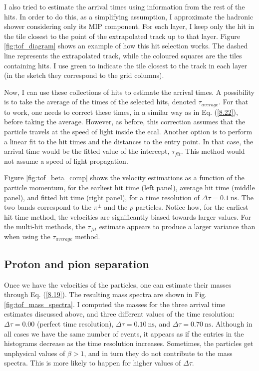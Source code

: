I also tried to estimate the arrival times using information from the rest of the hits. In order to do this, as a simplifying assumption, I approximate the hadronic shower considering only its MIP component. For each layer, I keep only the hit in the tile closest to the point of the extrapolated track up to that layer. Figure \ref{fig:tof_diagram} shows an example of how this hit selection works. The dashed line represents the extrapolated track, while the coloured squares are the tiles containing hits. I use green to indicate the tile closest to the track in each layer (in the sketch they correspond to the grid columns).

Now, I can use these collections of hits to estimate the arrival times. A possibility is to take the average of the times of the selected hits, denoted $\tau_{average}$. For that to work, one needs to correct these times, in a similar way as in Eq. (\ref{8.22}), before taking the average. However, as before, this correction assumes that the particle travels at the speed of light inside the \gls{ecal}. Another option is to perform a linear fit to the hit times and the distances to the entry point. In that case, the arrival time would be the fitted value of the intercept, $\tau_{fit}$. This method would not assume a speed of light propagation.

Figure \ref{fig:tof_beta_comp} shows the velocity estimations as a function of the particle momentum, for the earliest hit time (left panel), average hit time (middle panel), and fitted hit time (right panel), for a time resolution of $\Delta \tau = 0.1 ~ \mathrm{ns}$. The two bands correspond to the $\pi^{\pm}$ and the $p$ particles. Notice how, for the earliest hit time method, the velocities are significantly biased towards larger values. For the multi-hit methods, the $\tau_{fit}$ estimate appears to produce a larger variance than when using the $\tau_{average}$ method.

\subsection{Proton and pion separation}

Once we have the velocities of the particles, one can estimate their masses through Eq. (\ref{8.19}). The resulting mass spectra are shown in Fig. \ref{fig:tof_mass_spectra}. I computed the masses for the three arrival time estimates discussed above, and three different values of the time resolution: $\Delta \tau = 0.00$ (perfect time resolution), $\Delta \tau = 0.10 ~ \mathrm{ns}$, and $\Delta \tau = 0.70 ~ \mathrm{ns}$. Although in all cases we have the same number of events, it appears as if the entries in the histograms decrease as the time resolution increases. Sometimes, the particles get unphysical values of $\beta > 1$, and in turn they do not contribute to the mass spectra. This is more likely to happen for higher values of $\Delta \tau$.

